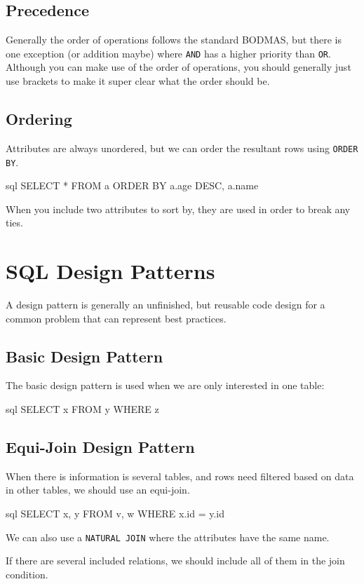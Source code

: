 \subsection{Precedence}\label{sub:precedencedsrseven}

Generally the order of operations follows the standard BODMAS, but there is one exception (or addition maybe) where \texttt{AND} has a higher priority than \texttt{OR}.
Although you can make use of the order of operations, you should generally just use brackets to make it super clear what the order should be.

\subsection{Ordering}\label{sub:ordering}

Attributes are always unordered, but we can order the resultant rows using \texttt{ORDER BY}.
\begin{code}{sql}
    SELECT * FROM a ORDER BY a.age DESC, a.name
\end{code}
\begin{note}
    When you include two attributes to sort by, they are used in order to break any ties.
\end{note}

\section{SQL Design Patterns}\label{sec:sql_design_patterns}

A design pattern is generally an unfinished, but reusable code design for a common problem that can represent best practices.

\subsection{Basic Design Pattern}\label{sub:basic_design_pattern}

The basic design pattern is used when we are only interested in one table:
\begin{code}{sql}
    SELECT x FROM y WHERE z
\end{code}

\subsection{Equi-Join Design Pattern}\label{sub:equi_join_design_pattern}

When there is information is several tables, and rows need filtered based on data in other tables, we should use an equi-join.
\begin{code}{sql}
    SELECT x,  y FROM v, w WHERE x.id = y.id
\end{code}
\begin{note}
    We can also use a \texttt{NATURAL JOIN} where the attributes have the same name.
\end{note}
\begin{note}
    If there are several included relations, we should include all of them in the join condition.
\end{note}

